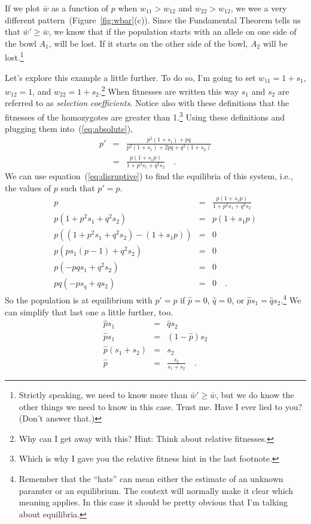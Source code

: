 If we plot $\bar w$ as a function of $p$ when $w_{11} > w_{12}$ and
$w_{22} > w_{12}$, we wee a very different
pattern~(Figure~\ref{fig:wbar}(c)). Since the Fundamental Theorem
tells us that $\bar w' \ge \bar w$, we know that if the population
starts with an allele on one side of the bowl $A_1$, will be lost. If
it starts on the other side of the bowl, $A_2$ will be
lost.\footnote{Strictly speaking, we need to know more than $\bar w'
  \ge \bar w$, but we do know the other things we need to know in this
  case. Trust me. Have I ever lied to you? (Don't answer
  that.)}

Let's explore this example a little further. To do so, I'm going to
set $w_{11} = 1 + s_1$, $w_{12} = 1$, and $w_{22} = 1+
s_2$.\footnote{Why can I get away with this? Hint: Think about
  relative fitnesses.} When fitnesses are written this way $s_1$ and
$s_2$ are referred to as {\it selection coefficients}. Notice also
with these definitions that the fitnesses of the homozygotes are
greater than 1.\footnote{Which is why I gave you the relative fitness
  hint in the last footnote.} Using these definitions and plugging
them into~(\ref{eq:absolute}),
\begin{eqnarray}
p' &=& \frac{p^2(1+s_1) + pq}{p^2(1+s_1) + 2pq + q^2(1+s_2)} \nonumber
   \\
   &=& \frac{p(1 + s_1p)}{1 + p^2s_1 + q^2s_2} \quad . \label{eq:disruptive}
\end{eqnarray}
We can use equation~(\ref{eq:disruptive}) to find the equilibria of
this system, i.e., the values of $p$ such that $p' = p$.
\begin{eqnarray*}
p &=& \frac{p(1 + s_1p)}{1 + p^2s_1 + q^2s_2} \\
p(1 + p^2s_1 + q^2s_2) &=& p(1 + s_1p) \\
p\left((1 + p^2s_1 + q^2s_2) - (1 + s_1p)\right) &=& 0 \\
p\left(ps_1(p - 1) + q^2s_2\right) &=& 0 \\
p(-pqs_1 + q^2s_2) &=& 0 \\
pq(-ps_q + qs_2) &=& 0 \quad .
\end{eqnarray*}
So the population is at equilibrium with $p'=p$ if $\hat p=0$,
$\hat q=0$, or $\hat ps_1 = \hat qs_2$.\footnote{Remember that the
  ``hats'' can mean either the estimate of an unknown paramter or an
  equilibrium. The context will normally make it clear which meaning
  applies. In this case it should be pretty obvious that I'm talking
  about equilibria.} We can simplify that last one a little further,
too.
\begin{eqnarray*}
\hat ps_1 &=& \hat qs_2 \\
\hat ps_1 &=& (1-\hat p)s_2 \\
\hat p(s_1 + s_2) &=& s_2 \\
\hat p &=& \frac{s_2}{s_1+s_2} \quad .
\end{eqnarray*}

